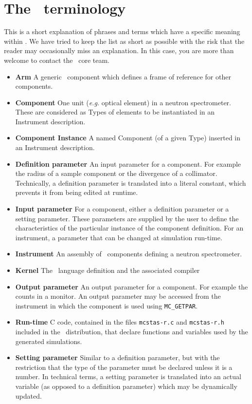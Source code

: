 
\chapter{The \MCX\ terminology}
\label{s:terminology}

This is a short explanation of phrases and terms which have a specific
meaning within \MCX. We have tried to keep the list as short
as possible with the risk that the reader may occasionally miss
an explanation. In this case, you are more than welcome to contact
the \MCX\ core team.

\noindent
\begin{itemize}
\item{\bfseries Arm}  A generic \MCX\ component which defines a frame of reference
      for other components.
\item{\bfseries Component} One unit ({\em e.g.} optical element) in a neutron
      spectrometer. These are considered as Types of elements to be instantiated in an Instrument description.
\item{\bfseries Component Instance} A named Component (of a given Type) inserted in an Instrument description.
\item{\bfseries Definition parameter} An input parameter for a component. For
  example the radius of a sample component or the divergence of a collimator. Technically, a definition parameter 
  is translated into a literal constant, which prevents it from being edited at runtime. 
\item{\bfseries Input parameter} For a component, either a definition parameter
or a setting parameter. These parameters are supplied by the user to
define the characteristics of the particular instance of the component
definition. For an instrument, a parameter that can be changed at
simulation run-time.
\item{\bfseries Instrument} An assembly of \MCX\ components defining
      a neutron spectrometer.
\item{\bfseries Kernel} The \MCX\ language definition and the associated compiler
\item{\bfseries Output parameter} An output parameter for a component.
  For example the counts in a monitor. An output parameter may be
  accessed from the instrument in which the component is used using
  \verb`MC_GETPAR`.
\item{\bfseries Run-time} C code, contained in the files
  \verb+mcstas-r.c+ and \verb+mcstas-r.h+ included in the \MCX\
  distribution, that declare functions and variables used by the
  generated simulations.
\item{\bfseries Setting parameter} Similar to a definition parameter, but with the
  restriction that the type of the parameter must be declared unless it is a number. In technical terms, 
  a setting parameter is translated into an actual variable (as opposed to a definition parameter) which 
  may be dynamically updated.
\end{itemize}
